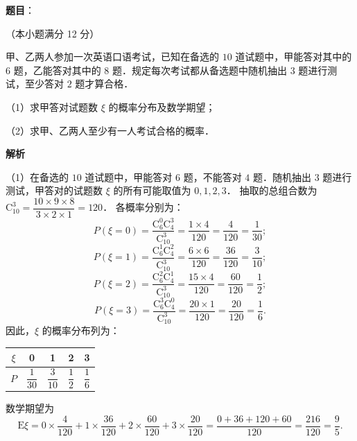 \begin{answer}

\textbf{题目}：

（本小题满分 12 分）

甲、乙两人参加一次英语口语考试，已知在备选的 $10$ 道试题中，甲能答对其中的 $6$ 题，乙能答对其中的 $8$ 题．规定每次考试都从备选题中随机抽出 $3$ 题进行测试，至少答对 $2$ 题才算合格．

（1）求甲答对试题数 $\xi$ 的概率分布及数学期望；

（2）求甲、乙两人至少有一人考试合格的概率．

\textbf{解析}

（1）在备选的 $10$ 道试题中，甲能答对 $6$ 题，不能答对 $4$ 题．随机抽出 $3$ 题进行测试，甲答对的试题数 $\xi$ 的所有可能取值为 $0, 1, 2, 3$．
抽取的总组合数为 $\mathrm{C}_{10}^3 = \dfrac{10 \times 9 \times 8}{3 \times 2 \times 1} = 120$．
各概率分别为：
\nopagebreak[4]
\[
P(\xi = 0) = \frac{\mathrm{C}_6^0 \mathrm{C}_4^3}{\mathrm{C}_{10}^3} = \frac{1 \times 4}{120} = \frac{4}{120} = \frac{1}{30};
\]
\nopagebreak[4]
\[
P(\xi = 1) = \frac{\mathrm{C}_6^1 \mathrm{C}_4^2}{\mathrm{C}_{10}^3} = \frac{6 \times 6}{120} = \frac{36}{120} = \frac{3}{10};
\]
\nopagebreak[4]
\[
P(\xi = 2) = \frac{\mathrm{C}_6^2 \mathrm{C}_4^1}{\mathrm{C}_{10}^3} = \frac{15 \times 4}{120} = \frac{60}{120} = \frac{1}{2};
\]
\nopagebreak[4]
\[
P(\xi = 3) = \frac{\mathrm{C}_6^3 \mathrm{C}_4^0}{\mathrm{C}_{10}^3} = \frac{20 \times 1}{120} = \frac{20}{120} = \frac{1}{6}.
\]
因此，$\xi$ 的概率分布列为：

\begin{center}
\begin{tabular}{ccccc}
\toprule
$\xi$ & 0 & 1 & 2 & 3 \\
\midrule
$P$ & $\dfrac{1}{30}$ & $\dfrac{3}{10}$ & $\dfrac{1}{2}$ & $\dfrac{1}{6}$ \\
\bottomrule
\end{tabular}
\end{center}

数学期望为
\nopagebreak[4]
\[
\mathrm{E}\xi = 0 \times \frac{4}{120} + 1 \times \frac{36}{120} + 2 \times \frac{60}{120} + 3 \times \frac{20}{120} = \frac{0 + 36 + 120 + 60}{120} = \frac{216}{120} = \frac{9}{5}.
\]


\end{answer}
